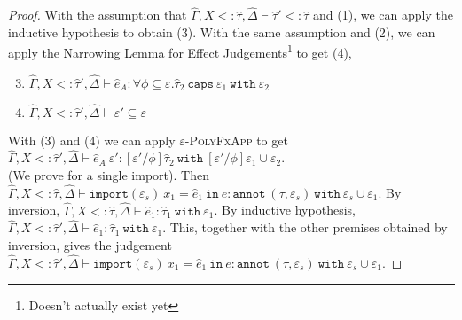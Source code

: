 \documentclass{llncs}
\newcommand{\keywadj}[1]{\mathtt{#1}}
\newcommand{\keyw}[1]{\keywadj{#1}~}
\newcommand{\kw}[1]{\keyw{ #1 }}
\newcommand{\kwa}[1]{\keywadj{ #1 }}
\begin{document}
\begin{proof}
With the assumption that $\hat \Gamma, X <: \hat \tau, \hat \Delta \vdash \hat \tau' <: \hat \tau$ and (1), we can apply the inductive hypothesis to obtain (3). With the same assumption and (2), we can apply the Narrowing Lemma for Effect Judgements\footnote{Doesn't actually exist yet} to get (4),

\begin{enumerate}
	\setcounter{enumi}{2}
	\item $\hat \Gamma, X <: \hat \tau', \hat \Delta \vdash \hat e_A: \forall \phi \subseteq \varepsilon. \hat \tau_2~\kw{caps} \varepsilon_1~\kw{with} \varepsilon_2$
	\item $\hat \Gamma, X <: \hat \tau', \hat \Delta \vdash \varepsilon' \subseteq \varepsilon$
\end{enumerate}

With (3) and (4) we can apply \textsc{$\varepsilon$-PolyFxApp} to get $\hat \Gamma, X <: \hat \tau', \hat \Delta \vdash \hat e_A~\varepsilon': [\varepsilon'/\phi]\hat \tau_2~\kw{with} [\varepsilon'/\phi]\varepsilon_1 \cup \varepsilon_2$. \\

 (We prove for a single import). Then $\hat \Gamma, X <: \hat \tau, \hat \Delta \vdash \kwa{import}(\varepsilon_s)~x_1 = \hat e_1~\kw{in} e: \kw{annot}(\tau, \varepsilon_s)~\kw{with} \varepsilon_s \cup \varepsilon_1$. By inversion, $\hat \Gamma, X <: \hat \tau, \hat \Delta \vdash \hat e_1: \hat \tau_1~\kw{with} \varepsilon_1$. By inductive hypothesis, $\hat \Gamma, X <: \hat \tau', \hat \Delta \vdash \hat e_1: \hat \tau_1~\kw{with} \varepsilon_1$. This, together with the other premises obtained by inversion, gives the judgement $\hat \Gamma, X <: \hat \tau', \hat \Delta \vdash \kwa{import}(\varepsilon_s)~x_1 = \hat e_1~\kw{in} e: \kw{annot}(\tau, \varepsilon_s)~\kw{with} \varepsilon_s \cup \varepsilon_1$.

\end{proof}
\end{document}
